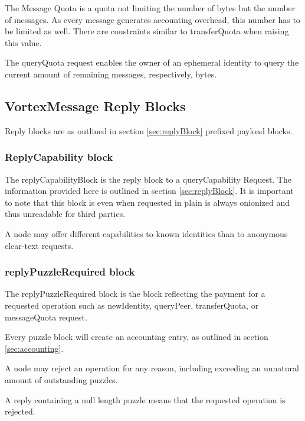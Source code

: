 The Message Quota is a quota not limiting the number of bytes but the number of messages. As every message generates accounting overhead, this number has to be limited as well. There are constraints similar to transferQuota when raising this value.

The queryQuota request enables the owner of an ephemeral identity to query the current amount of remaining messages, respectively, bytes.

\subsection{VortexMessage Reply Blocks}
Reply blocks are as outlined in section \ref{sec:replyBlock} prefixed payload blocks. 

\subsubsection{ReplyCapability block}
The replyCapabilityBlock is the reply block to a queryCapability Request. The information provided here is outlined in section \ref{sec:replyBlock}. It is important to note that this block is even when requested in plain is always onionized and thus unreadable for third parties. 

A node may offer different capabilities to known identities than to anonymous clear-text requests.

\subsubsection{replyPuzzleRequired block}


The replyPuzzleRequired block is the block reflecting the payment for a requested operation such as newIdentity, queryPeer, transferQuota, or messageQuota request.

Every puzzle block will create an accounting entry, as outlined in section \ref{sec:accounting}. 

A node may reject an operation for any reason, including exceeding an unnatural amount of outstanding puzzles.

A reply containing a null length puzzle means that the requested operation is rejected.

